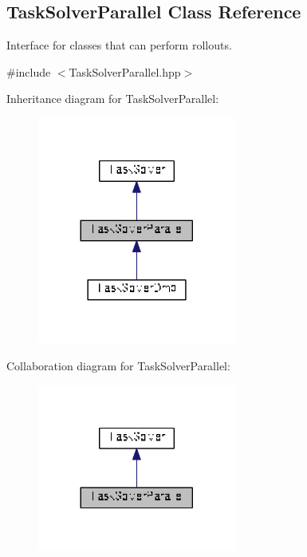 \hypertarget{classDmpBbo_1_1TaskSolverParallel}{\subsection{Task\+Solver\+Parallel Class Reference}
\label{classDmpBbo_1_1TaskSolverParallel}
}


Interface for classes that can perform rollouts.  




{\ttfamily \#include $<$Task\+Solver\+Parallel.\+hpp$>$}



Inheritance diagram for Task\+Solver\+Parallel\+:
\nopagebreak
\begin{figure}[H]
\begin{center}
\leavevmode
\includegraphics[width=185pt]{classDmpBbo_1_1TaskSolverParallel__inherit__graph}
\end{center}
\end{figure}


Collaboration diagram for Task\+Solver\+Parallel\+:
\nopagebreak
\begin{figure}[H]
\begin{center}
\leavevmode
\includegraphics[width=185pt]{classDmpBbo_1_1TaskSolverParallel__coll__graph}
\end{center}
\end{figure}
